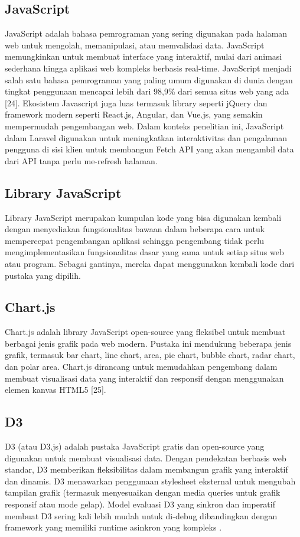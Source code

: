 \subsection{JavaScript}
JavaScript adalah bahasa pemrograman yang sering digunakan pada halaman web untuk mengolah, memanipulasi, atau memvalidasi data. JavaScript memungkinkan untuk membuat interface yang interaktif, mulai dari animasi sederhana hingga aplikasi web kompleks berbasis real-time. JavaScript menjadi salah satu bahasa pemrograman yang paling umum digunakan di dunia dengan tingkat penggunaan mencapai lebih dari 98,9\% dari semua situs web yang ada [24]. Ekosistem Javascript juga luas termasuk library seperti jQuery dan framework modern seperti React.js, Angular, dan Vue.js, yang semakin mempermudah pengembangan web. Dalam konteks penelitian ini, JavaScript dalam Laravel digunakan untuk meningkatkan interaktivitas dan pengalaman pengguna di sisi klien untuk membangun Fetch API yang akan mengambil data dari API tanpa perlu me-refresh halaman.

\subsection{Library JavaScript}
Library JavaScript merupakan kumpulan kode yang bisa digunakan kembali dengan menyediakan fungsionalitas bawaan dalam beberapa cara untuk mempercepat pengembangan aplikasi sehingga pengembang tidak perlu mengimplementasikan fungsionalitas dasar yang sama untuk setiap situs web atau program. Sebagai gantinya, mereka dapat menggunakan kembali kode dari pustaka yang dipilih.

\subsection{Chart.js}
Chart.js adalah library JavaScript open-source yang fleksibel untuk membuat berbagai jenis grafik pada web modern. Pustaka ini mendukung beberapa jenis grafik, termasuk bar chart, line chart, area, pie chart, bubble chart, radar chart, dan polar area. Chart.js dirancang untuk memudahkan pengembang dalam membuat visualisasi data yang interaktif dan responsif dengan menggunakan elemen kanvas HTML5 [25].

\subsection{D3}
D3 (atau D3.js) adalah pustaka JavaScript gratis dan open-source yang digunakan untuk membuat visualisasi data. Dengan pendekatan berbasis web standar, D3 memberikan fleksibilitas dalam membangun grafik yang interaktif dan dinamis.  D3 menawarkan penggunaan stylesheet eksternal untuk mengubah tampilan grafik (termasuk menyesuaikan dengan media queries untuk grafik responsif atau mode gelap). Model evaluasi D3 yang sinkron dan imperatif membuat D3 sering kali lebih mudah untuk di-debug dibandingkan dengan framework yang memiliki runtime asinkron yang kompleks \cite{D3}.

